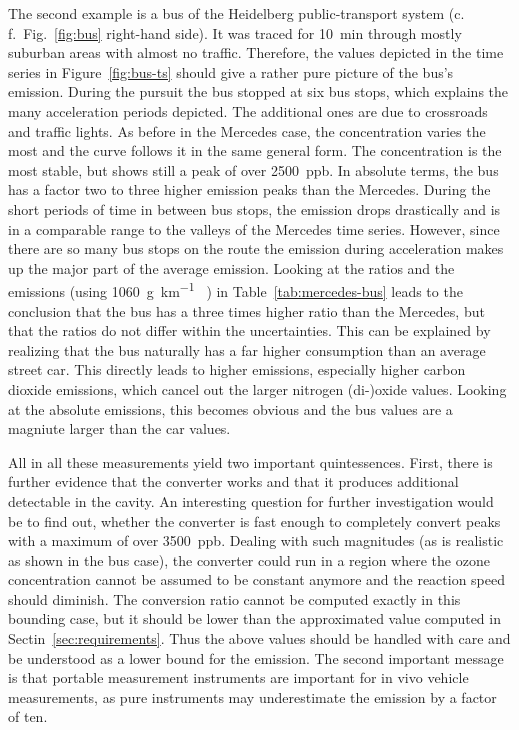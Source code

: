 The second example is a bus of the Heidelberg public-transport system
(c.\,f.\ Fig.~\ref{fig:bus} right-hand side). It was traced for
\SI{10}{\minute} through mostly suburban areas with almost no
traffic. Therefore, the values depicted in the time series in
Figure~\ref{fig:bus-ts} should give a rather pure picture of the bus's
emission. During the pursuit the bus stopped at six bus stops, which
explains the many acceleration periods depicted. The additional ones
are due to crossroads and traffic lights. As before in the Mercedes
case, the  concentration varies the most and the 
curve follows it in the same general form. The  concentration
is the most stable, but shows still a peak of over \SI{2500}{ppb}. In
absolute terms, the bus has a factor two to three higher 
emission peaks than the Mercedes. During the short periods of time in
between bus stops, the emission drops drastically and is in a
comparable range to the valleys of the Mercedes time series. However,
since there are so many bus stops on the route the emission during
acceleration makes up the major part of the average emission. Looking
at the ratios and the emissions (using \SI{1060}{\gram\per\kilo\meter}
~\cite{denis}) in Table~\ref{tab:mercedes-bus} leads to the
conclusion that the bus has a three times higher  ratio than
the Mercedes, but that the  ratios do not differ within the
uncertainties. This can be explained by realizing that the bus
naturally has a far higher consumption than an average street
car. This directly leads to higher emissions, especially higher carbon
dioxide emissions, which cancel out the larger nitrogen (di-)oxide
values. Looking at the absolute emissions, this becomes obvious and
the bus values are a magniute larger than the car values.

All in all these measurements yield two important
quintessences. First, there is further evidence that the converter
works and that it produces additional detectable  in the
cavity. An interesting question for further investigation would be to
find out, whether the converter is fast enough to completely convert
 peaks with a maximum of over \SI{3500}{ppb}. Dealing with
such magnitudes (as is realistic as shown in the bus case), the
converter could run in a region where the ozone concentration cannot
be assumed to be constant anymore and the reaction speed should
diminish. The conversion ratio cannot be computed exactly in this
bounding case, but it should be lower than the approximated value
computed in Sectin~\ref{sec:requirements}. Thus the above 
values should be handled with care and be understood as a lower bound
for the emission. The second important message is that portable
 measurement instruments are important for in vivo vehicle
measurements, as pure  instruments may underestimate the
 emission by a factor of ten.

